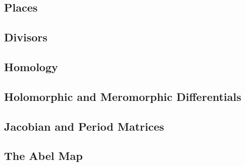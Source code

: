 \subsection{Places}\label{subsec:background-places}

\subsection{Divisors}\label{subsec:background-divisors}

\subsection{Homology}\label{subsec:background-homology}

\subsection{Holomorphic and Meromorphic
  Differentials}\label{subsec:background-holomorphic-and-meromorphic-differentials}

\subsection{Jacobian and Period
  Matrices}\label{subsec:background-jacobian-and-period-matrices}

\subsection{The Abel Map}\label{subsec:background-the-abel-map}

